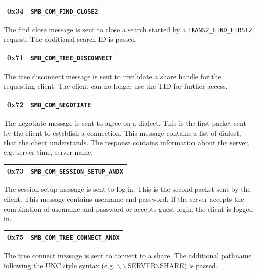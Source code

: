 \documentclass[11pt,a4paper]{book}
\begin{document}
\begin{center}
\renewcommand{\tabcolsep}{5mm}
\begin{tabular}{p{3cm}p{8cm}}
0x34 & \texttt{SMB\_COM\_FIND\_CLOSE2} \\
\hline
\end{tabular}
\end{center}
The find close message is sent to close a search started by a \texttt{TRANS2\_FIND\_FIRST2} request. The additional search ID is passed.

\begin{center}
\renewcommand{\tabcolsep}{5mm}
\begin{tabular}{p{3cm}p{8cm}}
0x71 & \texttt{SMB\_COM\_TREE\_DISCONNECT} \\
\hline
\end{tabular}
\end{center}
The tree disconnect message is sent to invalidate a share handle for the requesting client. The client can no longer use the TID for further access.

\begin{center}
\renewcommand{\tabcolsep}{5mm}
\begin{tabular}{p{3cm}p{8cm}}
0x72 & \texttt{SMB\_COM\_NEGOTIATE} \\
\hline
\end{tabular}
\end{center}
The negotiate message is sent to agree on a dialect. This is the first packet sent by the client to establish a connection. This message contains a list of dialect, that the client understands. The response contains information about the server, e.g. server time, server name.

\begin{center}
\renewcommand{\tabcolsep}{5mm}
\begin{tabular}{p{3cm}p{8cm}}
0x73 & \texttt{SMB\_COM\_SESSION\_SETUP\_ANDX} \\
\hline
\end{tabular}
\end{center}
The session setup message is sent to log in. This is the second packet sent by the client. This message contains username and password. If the server accepts the combination of username and password or accepts guest login, the client is logged in.

\begin{center}
\renewcommand{\tabcolsep}{5mm}
\begin{tabular}{p{3cm}p{8cm}}
0x75 & \texttt{SMB\_COM\_TREE\_CONNECT\_ANDX} \\
\hline
\end{tabular}
\end{center}
The tree connect message is sent to connect to a share. The additional pathname following the UNC style syntax (e.g. $\backslash\backslash$SERVER$\backslash$SHARE) is passed.
\end{document}
